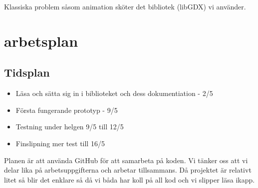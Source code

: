 \documentclass[a4paper,11pt]{article}
\begin{document}
Klassiska problem såsom animation sköter det bibliotek (libGDX) vi använder.

\section{arbetsplan}
\subsection{Tidsplan}
\begin{itemize}
\item Läsa och sätta sig in i biblioteket och dess dokumentiation - 2/5
\item Första fungerande prototyp - 9/5
\item Testning under helgen 9/5 till 12/5
\item Finslipning mer test till 16/5
\end{itemize}

Planen är att använda GitHub för att samarbeta på koden. Vi tänker oss att vi delar lika på arbetsuppgifterna och arbetar tillsammans. Då projektet är relativt litet så blir det enklare så då vi båda har koll på all kod och vi slipper läsa ikapp.
\pagebreak
\end{document}

